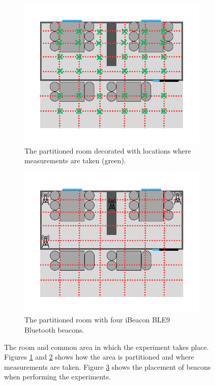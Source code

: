 \begin{figure}
\begin{subfigure}[b]{0.48\textwidth}
        \label{fig:room_partition}
    \end{subfigure}
    \begin{subfigure}[b]{0.48\textwidth}
        \includegraphics[width=\textwidth]{images/roomwithgridandmeasurements.png}
        \caption{The partitioned room decorated with locations where measurements are taken (green).}
        \label{fig:room_partition_measurements}
    \end{subfigure}
    \begin{subfigure}[b]{0.48\textwidth}
        \includegraphics[width=\textwidth]{images/gridwithbeacons.png}
        \caption{The partitioned room with four iBeacon BLE9 Bluetooth beacons.}
        \label{fig:room_partition_beacons}
    \end{subfigure}
    \caption{The room and common area in which the experiment takes place. Figures \ref{fig:room_partition} and \ref{fig:room_partition_measurements} shows how the area is partitioned and where measurements are taken. Figure \ref{fig:room_partition_beacons} shows the placement of beacons when performing the experiments.}
    \label{fig:allfiguresForTheGridPartition}
\end{figure}
